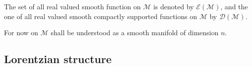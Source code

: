 \documentclass[10pt]{book}
\newcommand{\Dcal}{\mathcal{D}}
\newcommand{\Ecal}{\mathcal{E}}
\newcommand{\Mcal}{\mathcal{M}}
\newcommand{\Rbb}{\mathbb{R}}
\theoremstyle{break}
\begin{document}
The set of all real valued smooth function on $\Mcal$ is denoted by $\Ecal(\Mcal)$, and the one of all real valued smooth compactly supported functions on $\Mcal$ by $\Dcal(\Mcal)$. 


%
%
%
%
%
%
\bigskip


For now on $\Mcal$ shall be understood as a smooth manifold of dimension $n$. 


\subsection{Lorentzian structure}



\end{document}
